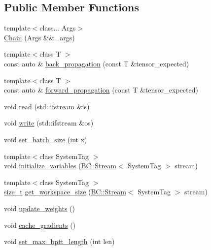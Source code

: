 \subsection*{Public Member Functions}
\begin{DoxyCompactItemize}
\item 
{\footnotesize template$<$class... Args$>$ }\\\hyperlink{structBC_1_1nn_1_1Chain_adae78d2d981f8e8568101576987a9b47}{Chain} (Args \&\&...args)
\item 
{\footnotesize template$<$class T $>$ }\\const auto \& \hyperlink{structBC_1_1nn_1_1Chain_accefa2d4b8ce0dbeab98934fc4cb0147}{back\+\_\+propagation} (const T \&tensor\+\_\+expected)
\item 
{\footnotesize template$<$class T $>$ }\\const auto \& \hyperlink{structBC_1_1nn_1_1Chain_ad897096a95ccd0a3974114ac1794d16e}{forward\+\_\+propagation} (const T \&tensor\+\_\+expected)
\item 
void \hyperlink{structBC_1_1nn_1_1Chain_a0326ba60c43fc89e723533c851181822}{read} (std\+::ifstream \&is)
\item 
void \hyperlink{structBC_1_1nn_1_1Chain_a4655d321daaa900048d0237618f2ff35}{write} (std\+::ifstream \&os)
\item 
void \hyperlink{structBC_1_1nn_1_1Chain_a9cd23d83054be857c93f30bdc8869d86}{set\+\_\+batch\+\_\+size} (int x)
\item 
{\footnotesize template$<$class System\+Tag $>$ }\\void \hyperlink{structBC_1_1nn_1_1Chain_a4149a6682cc60a9d819fcc5c8b5eff84}{initialize\+\_\+variables} (\hyperlink{namespaceBC_abc64a63cd29a22d102a68f478dfd588d}{B\+C\+::\+Stream}$<$ System\+Tag $>$ stream)
\item 
{\footnotesize template$<$class System\+Tag $>$ }\\\hyperlink{namespaceBC_a6007cbc4eeec401a037b558910a56173}{size\+\_\+t} \hyperlink{structBC_1_1nn_1_1Chain_ae01691a2d7cb81a44916c73c76039ff2}{get\+\_\+workspace\+\_\+size} (\hyperlink{namespaceBC_abc64a63cd29a22d102a68f478dfd588d}{B\+C\+::\+Stream}$<$ System\+Tag $>$ stream)
\item 
void \hyperlink{structBC_1_1nn_1_1Chain_a93f5c719cf2c966c22519ef608019406}{update\+\_\+weights} ()
\item 
void \hyperlink{structBC_1_1nn_1_1Chain_a606eeb347bc8454a1c33aebd973c00b8}{cache\+\_\+gradients} ()
\item 
void \hyperlink{structBC_1_1nn_1_1Chain_a9e66e038dcdb69078901c2b1e6b5e26c}{set\+\_\+max\+\_\+bptt\+\_\+length} (int len)

\end{DoxyCompactItemize}
